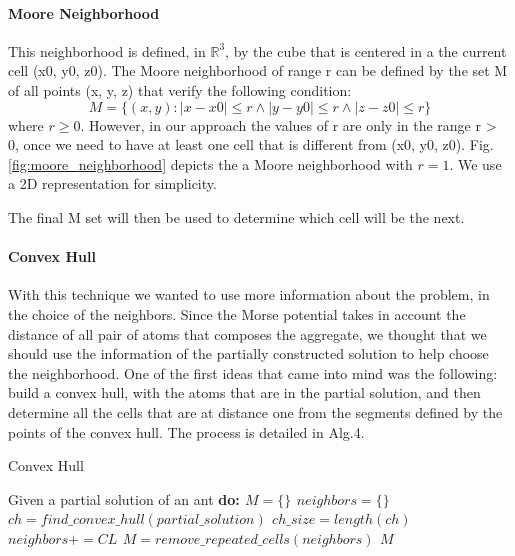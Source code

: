 		\paragraph*{Moore Neighborhood}
			This neighborhood is defined, in $\mathbb{R}^3$, by the cube that is centered in a the current cell (x0, y0, z0). The Moore neighborhood of range r can be defined by the set M of all points (x, y, z) that verify the following condition:
			\begin{equation}
				M= \{(x,y):|x-x0| \leq r \wedge |y-y0| \leq r \wedge |z-z0| \leq r\}
			\end{equation}
			where $r \geq 0$. However, in our approach the values of r are only in the range r > 0, once we need to have at least one cell that is different from (x0, y0, z0). Fig. \ref{fig:moore_neighborhood} depicts the a Moore neighborhood with $r = 1$. We use a 2D representation for simplicity. 
			
			
			The final M set will then be used to determine which cell will be the next.
			
			\paragraph*{Convex Hull}
			With this technique we wanted to use more information about the problem, in the choice of the neighbors. Since the Morse potential takes in account the distance of all pair of atoms that composes the aggregate, we thought that we should use the information of the partially constructed solution to help choose the neighborhood. One of the first ideas that came into mind was the following: build a convex hull, with the atoms that are in the partial solution, and then determine all the cells that are at distance one from the segments defined by the points of the convex hull. The process is detailed in Alg.4.
			\begin{algorithm}
				\caption{Convex Hull}
				\label{alg:convex_hull}
				\begin{algorithmic}
				\STATE Given a partial solution of an ant \bf{do}:
				\STATE $M = \{\}$
				\STATE $neighbors = \{\}$
				\STATE $ch = find\_convex\_hull(partial\_solution)$
				\STATE $ch\_size = length(ch)$
							\STATE $neighbors += CL$
						\ENDIF
					\ENDFOR
				\ENDFOR
				\STATE $M = remove\_repeated\_cells(neighbors)$
				\RETURN $M$
				\end{algorithmic}
			\end{algorithm}
			
